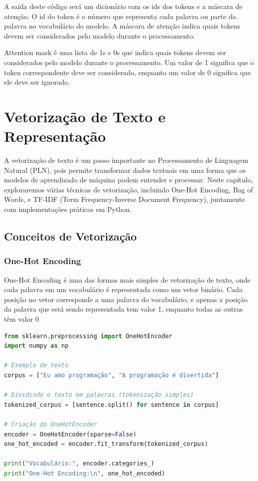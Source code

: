 \documentclass[14pt,a4paper,oneside]{book}
\begin{document}
A saída deste código será um dicionário com os ids dos tokens e a máscara de atenção. O id do token é o número que representa cada palavra ou parte da palavra no vocabulário do modelo. A máscara de atenção indica quais tokens devem ser considerados pelo modelo durante o processamento.

Attention mask é uma lista de 1s e 0s que indica quais tokens devem ser considerados pelo modelo durante o processamento. Um valor de 1 significa que o token correspondente deve ser considerado, enquanto um valor de 0 significa que ele deve ser ignorado.



	
\chapter{Vetorização de Texto e Representação}

A vetorização de texto é um passo importante no Processamento de Linguagem Natural (PLN), pois permite transformar dados textuais em uma forma que os modelos de aprendizado de máquina podem entender e processar. Neste capítulo, exploraremos várias técnicas de vetorização, incluindo One-Hot Encoding, Bag of Words, e TF-IDF (Term Frequency-Inverse Document Frequency), juntamente com implementações práticas em Python.

\section{Conceitos de Vetorização}

\subsection{One-Hot Encoding}
One-Hot Encoding é uma das formas mais simples de vetorização de texto, onde cada palavra em um vocabulário é representada como um vetor binário. Cada posição no vetor corresponde a uma palavra do vocabulário, e apenas a posição da palavra que está sendo representada tem valor 1, enquanto todas as outras têm valor 0.

\begin{lstlisting}[language=Python]
from sklearn.preprocessing import OneHotEncoder
import numpy as np

# Exemplo de texto
corpus = ["Eu amo programação", "A programação é divertida"]

# Dividindo o texto em palavras (tokenização simples)
tokenized_corpus = [sentence.split() for sentence in corpus]

# Criação do OneHotEncoder
encoder = OneHotEncoder(sparse=False)
one_hot_encoded = encoder.fit_transform(tokenized_corpus)

print("Vocabulário:", encoder.categories_)
print("One-Hot Encoding:\n", one_hot_encoded)
\end{lstlisting}
\end{document}
